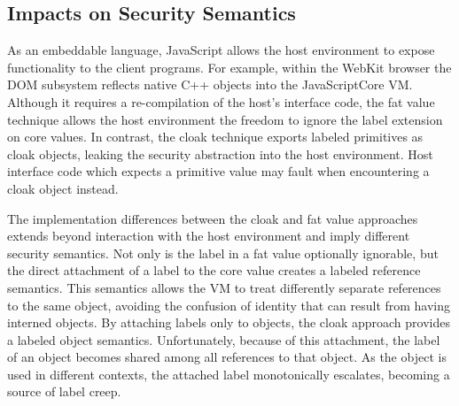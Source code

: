\subsection{Impacts on Security Semantics}
\label{sec:impacts-on-security-semantics}

As an embeddable language, JavaScript allows the host environment to expose functionality to the client programs.
For example, within the WebKit browser the DOM subsystem reflects native C++ objects into the JavaScriptCore VM.
Although it requires a re-compilation of the host's interface code, the fat value technique allows the host environment the freedom to ignore the label extension on core values.
In contrast, the cloak technique exports labeled primitives as cloak objects, leaking the security abstraction into the host environment.
Host interface code which expects a primitive value may fault when encountering a cloak object instead.

The implementation differences between the cloak and fat value approaches extends beyond interaction with the host environment and imply different security semantics.
Not only is the label in a fat value optionally ignorable, but the direct attachment of a label to the core value creates a labeled reference semantics.
This semantics allows the VM to treat differently separate references to the same object, avoiding the confusion of identity that can result from having interned objects.
By attaching labels only to objects, the cloak approach provides a labeled object semantics.
Unfortunately, because of this attachment, the label of an object becomes shared among all references to that object.
As the object is used in different contexts, the attached label monotonically escalates, becoming a source of label creep.

\medskip
\begin{figure}[h]
\centering
{}
\end{figure}
\medskip

